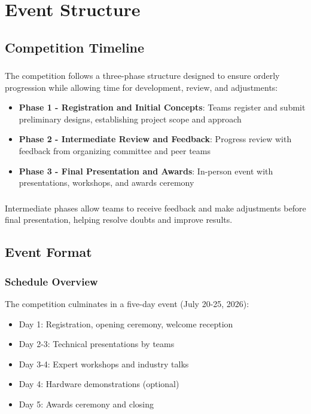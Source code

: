 
\renewcommand{\thesection}{ES}
\section{Event Structure}

\subsection{Competition Timeline}

\subsubsection{}
The competition follows a three-phase structure designed to ensure orderly progression while allowing time for development, review, and adjustments:

\begin{itemize}[noitemsep]
    \item \textbf{Phase 1 - Registration and Initial Concepts}: Teams register and submit preliminary designs, establishing project scope and approach
    \item \textbf{Phase 2 - Intermediate Review and Feedback}: Progress review with feedback from organizing committee and peer teams
    \item \textbf{Phase 3 - Final Presentation and Awards}: In-person event with presentations, workshops, and awards ceremony
\end{itemize}

\subsubsection{}
Intermediate phases allow teams to receive feedback and make adjustments before final presentation, helping resolve doubts and improve results.

\subsection{Event Format}

\subsubsection{Schedule Overview}
The competition culminates in a five-day event (July 20-25, 2026):

\begin{itemize}[noitemsep]
    \item Day 1: Registration, opening ceremony, welcome reception
    \item Day 2-3: Technical presentations by teams
    \item Day 3-4: Expert workshops and industry talks
    \item Day 4: Hardware demonstrations (optional)
    \item Day 5: Awards ceremony and closing
\end{itemize}

